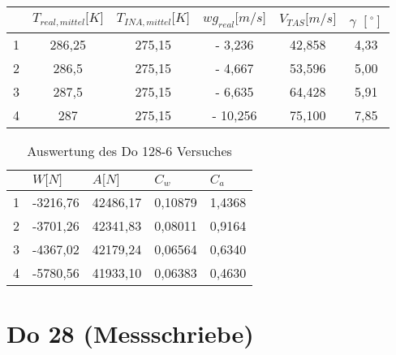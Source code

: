 \begin{table}[h]
	\centering
	\begin{tabular}{|c|c|c|c|c|c|}
		\hline
		& \multicolumn{1}{l|}{\textbf{$T_{real,mittel} {[}K{]}$}} & \multicolumn{1}{l|}{\textbf{$T_{INA,mittel} {[}K{]}$}} & \textbf{$wg_{real} {[}m/s{]}$} & \textbf{$V_{TAS} {[}m/s{]}$} & $\gamma$ $[^\circ]$ \\ \hline
		1 & 286,25                                        & 275,15                                       & - 3,236                     & 42,858                  & 4,33                   \\ \hline
		2 & 286,5                                         & 275,15                                       & - 4,667                    & 53,596                  & 5,00                   \\ \hline
		3 & 287,5                                         & 275,15                                       & - 6,635                    & 64,428                  & 5,91                   \\ \hline
		4 & 287                                           & 275,15                                       & - 10,256                   & 75,100                  & 7,85                   \\ \hline
	\end{tabular}
\end{table}

\begin{table}[h]
	\centering
	\begin{tabular}{|l|l|l|l|l|}
		\hline
		& \textbf{$W {[}N{]}$} & \textbf{$A {[}N{]}$} & \textbf{$C_w$} & \textbf{$C_a$} \\ \hline
		1 & -3216,76           & 42486,17           & 0,10879     & 1,4368      \\ \hline
		2 & -3701,26           & 42341,83           & 0,08011     & 0,9164      \\ \hline
		3 & -4367,02           & 42179,24           & 0,06564     & 0,6340      \\ \hline
		4 & -5780,56           & 41933,10           & 0,06383     & 0,4630      \\ \hline
	\end{tabular}
	\caption{Auswertung des Do 128-6 Versuches}
\end{table}








\vspace{1cm}
\section{Do 28 (Messschriebe)}

\newpage